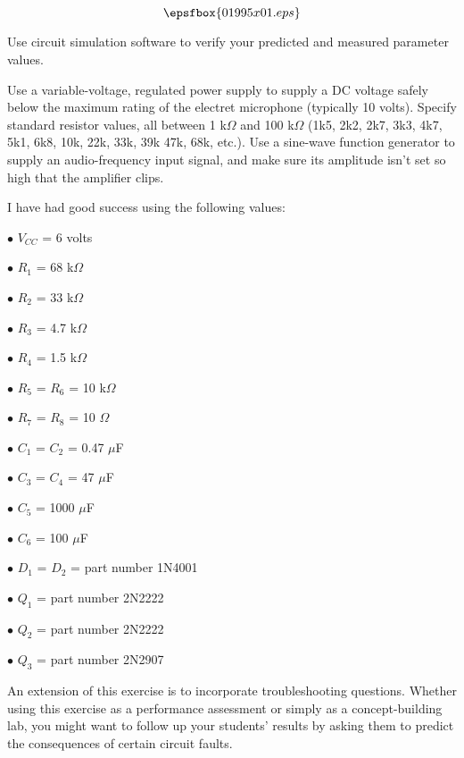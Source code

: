 

$$\epsfbox{01995x01.eps}$$

\vfil \eject






Use circuit simulation software to verify your predicted and measured parameter values.







Use a variable-voltage, regulated power supply to supply a DC voltage safely below the maximum rating of the electret microphone (typically 10 volts).  Specify standard resistor values, all between 1 k$\Omega$ and 100 k$\Omega$ (1k5, 2k2, 2k7, 3k3, 4k7, 5k1, 6k8, 10k, 22k, 33k, 39k 47k, 68k, etc.).  Use a sine-wave function generator to supply an audio-frequency input signal, and make sure its amplitude isn't set so high that the amplifier clips.

I have had good success using the following values:

\medskip
\item{$\bullet$} $V_{CC}$ = 6 volts
\item{$\bullet$} $R_1$ = 68 k$\Omega$
\item{$\bullet$} $R_2$ = 33 k$\Omega$
\item{$\bullet$} $R_3$ = 4.7 k$\Omega$
\item{$\bullet$} $R_4$ = 1.5 k$\Omega$
\item{$\bullet$} $R_5$ = $R_6$ = 10 k$\Omega$
\item{$\bullet$} $R_7$ = $R_8$ = 10 $\Omega$
\item{$\bullet$} $C_1$ = $C_2$ = 0.47 $\mu$F
\item{$\bullet$} $C_3$ = $C_4$ = 47 $\mu$F
\item{$\bullet$} $C_5$ = 1000 $\mu$F
\item{$\bullet$} $C_6$ = 100 $\mu$F
\item{$\bullet$} $D_1$ = $D_2$ = part number 1N4001
\item{$\bullet$} $Q_1$ = part number 2N2222
\item{$\bullet$} $Q_2$ = part number 2N2222
\item{$\bullet$} $Q_3$ = part number 2N2907
\medskip

An extension of this exercise is to incorporate troubleshooting questions.  Whether using this exercise as a performance assessment or simply as a concept-building lab, you might want to follow up your students' results by asking them to predict the consequences of certain circuit faults.




